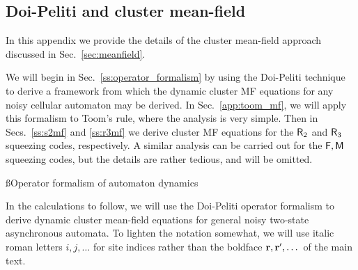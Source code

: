 \documentclass[pra,aps,twocolumn,groupedaddress,superscriptaddress,nofootinbib,preprintnumbers]{revtex4-2}
\begin{document}
\begin{widetext}
		
		\section{Doi-Peliti and cluster mean-field}\label{app:mf}
		
		In this appendix we provide the details of the cluster mean-field approach discussed in Sec.~\ref{sec:meanfield}. 
		
		We will begin in Sec.~\ref{ss:operator_formalism} by using the Doi-Peliti technique to derive a framework from which the dynamic cluster MF equations for any noisy cellular automaton may be derived. In Sec.~\ref{app:toom_mf}, we will apply this formalism to Toom's rule, where the analysis is very simple. Then in Secs.~\ref{ss:s2mf} and \ref{ss:r3mf} we derive cluster MF equations for the $\mathsf{R}_2$ and $\mathsf{R}_3$ squeezing codes, respectively. A similar analysis can be carried out for the $\mathsf{F},\mathsf{M}$ squeezing codes, but the details are rather tedious, and will be omitted. 
		
		
		\ss{Operator formalism of automaton dynamics}	\label{ss:operator_formalism}
		
		In the calculations to follow, we will use the Doi-Peliti operator formalism \cite{doi1976second} to derive dynamic cluster mean-field equations for general noisy two-state asynchronous automata. To lighten the notation somewhat, we will use italic roman letters $i,j,\dots$ for site indices rather than the boldface $\mathbf{r},\mathbf{r}',\dots$ of the main text. 
		

\end{widetext}
\end{document}
